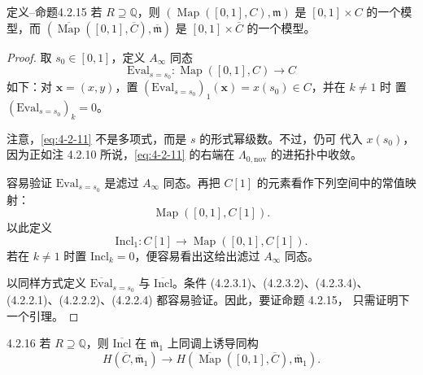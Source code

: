 \begin{statement}{定义--命题}{4.2.15}\label{def-prop:4-2-15}
若 $R\supseteq\mathbb Q$，则
$(\operatorname{Map}([0,1],C),\mathfrak m)$ 是
$[0,1]\times C$ 的一个模型，而
$(\overline{\operatorname{Map}}([0,1],\overline C),
\overline{\mathfrak m})$ 是 $[0,1]\times\overline C$ 的一个模型。
\end{statement}

\begin{proof}
取 $s_0\in[0,1]$，定义 $A_\infty$ 同态
\[
 \mathrm{Eval}_{s=s_0}\colon\operatorname{Map}([0,1],C)\longrightarrow C
\]
如下：对 $\mathbf x=(x,y)$，置
$(\mathrm{Eval}_{s=s_0})_1(\mathbf x)=x(s_0)\in C$，并在 $k\ne1$ 时
置 $(\mathrm{Eval}_{s=s_0})_k=0$。

注意，\eqref{eq:4-2-11} 不是多项式，而是 $s$ 的形式幂级数。不过，仍可
代入 $x(s_0)$，因为正如注 4.2.10 所说，\eqref{eq:4-2-11} 的右端在
$\Lambda_{0,\mathrm{nov}}$ 的进拓扑中收敛。

容易验证 $\mathrm{Eval}_{s=s_0}$ 是滤过 $A_\infty$ 同态。再把 $C[1]$
的元素看作下列空间中的常值映射：
\[
 \operatorname{Map}([0,1],C[1]).
\]
以此定义
\[
 \mathrm{Incl}_1\colon C[1]\longrightarrow
 \operatorname{Map}([0,1],C[1]).
\]
若在 $k\ne1$ 时置 $\mathrm{Incl}_k=0$，便容易看出这给出滤过
$A_\infty$ 同态。

以同样方式定义 $\overline{\mathrm{Eval}}_{s=s_0}$ 与
$\overline{\mathrm{Incl}}$。条件 (4.2.3.1)、(4.2.3.2)、(4.2.3.4)、
(4.2.2.1)、(4.2.2.2)、(4.2.2.4) 都容易验证。因此，要证命题 4.2.15，
只需证明下一个引理。
\end{proof}

\begin{lemma}{4.2.16}\label{lem:4-2-16}
若 $R\supseteq\mathbb Q$，则 $\overline{\mathrm{Incl}}$ 在
$\overline{\mathfrak m}_1$ 上同调上诱导同构
\[
 H(\overline C,\overline{\mathfrak m}_1)
 \longrightarrow
 H(\overline{\operatorname{Map}}([0,1],\overline C),
   \overline{\mathfrak m}_1).
\]
\end{lemma}

